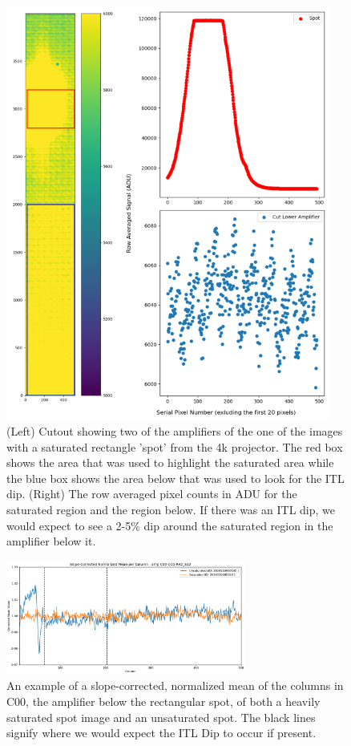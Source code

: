\begin{figure}[ht]
\centering
\includegraphics[width=0.95\textwidth]{figures/RectangleCutout.png}
\caption{(Left) Cutout showing two of the amplifiers of the one of the images with a saturated rectangle 'spot' from the 4k projector. The red box shows the area that was used to highlight the saturated area while the  blue box shows the area below that was used to look for the ITL dip. (Right) The row averaged pixel counts in ADU for the saturated region and the region below. If there was an ITL dip, we would expect to see a 2-5\% dip around the saturated region in the amplifier below it.}
\label{fig:ITLDip_Rectangle}
\end{figure}

\begin{figure}[ht]
\centering
\includegraphics[width=0.7\textwidth]{figures/Slope-CorrectedNormalizedMeanperColumn_ampC00CCDR42_S12.png}
\caption{An example of a slope-corrected, normalized mean of the columns in C00, the amplifier below the rectangular spot, of both a heavily saturated spot image and an unsaturated spot. The black lines signify where we would expect the ITL Dip to occur if present.}
\label{fig:ITLDip_Yassine}
\end{figure}

